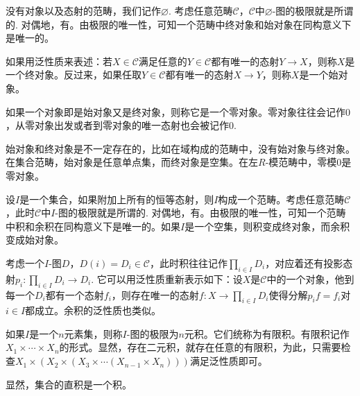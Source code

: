 \begin{para}[终对象与始对象]
没有对象以及态射的范畴，我们记作$\varnothing$. 考虑任意范畴$\mathcal{C}$，$\mathcal{C}$中$\varnothing$-图的极限就是所谓的. 对偶地，有。由极限的唯一性，可知一个范畴中终对象和始对象在同构意义下是唯一的。

如果用泛性质来表述：若$X\in \mathcal{C}$满足任意的$Y\in \mathcal{C}$都有唯一的态射$Y\to X$，则称$X$是一个终对象。反过来，如果任取$Y\in \mathcal{C}$都有唯一的态射$X\to Y$，则称$X$是一个始对象。

如果一个对象即是始对象又是终对象，则称它是一个零对象。零对象往往会记作$0$，从零对象出发或者到零对象的唯一态射也会被记作$0$.

始对象和终对象是不一定存在的，比如在域构成的范畴中，没有始对象与终对象。在集合范畴，始对象是任意单点集，而终对象是空集。在左$R$-模范畴中，零模$0$是零对象。
\end{para}

\begin{para}[积与余积]
设$I$是一个集合，如果附加上所有的恒等态射，则$I$构成一个范畴。考虑任意范畴$\mathcal{C}$，此时$\mathcal{C}$中$I$-图的极限就是所谓的. 对偶地，有。由极限的唯一性，可知一个范畴中积和余积在同构意义下是唯一的。如果$I$是一个空集，则积变成终对象，而余积变成始对象。

考虑一个$I$-图$D$，$D(i)=D_i\in \mathcal{C}$，此时积往往记作$\prod_{i\in I} D_i$，对应着还有投影态射$p_i:\prod_{i\in I} D_i\to D_i$. 它可以用泛性质重新表示如下：设$X$是$\mathcal{C}$中的一个对象，他到每一个$D_i$都有一个态射$f_i$，则存在唯一的态射$f:X\to \prod_{i\in I} D_i$使得分解$p_if=f_i$对$i\in I$都成立。余积的泛性质也类似。

如果$I$是一个$n$元素集，则称$I$-图的极限为$n$元积。它们统称为有限积。有限积记作$X_1\times \cdots \times X_n$的形式。显然，存在二元积，就存在任意的有限积，为此，只需要检查$X_1\times (X_2\times (X_3 \times \cdots (X_{n-1}\times X_n)))$满足泛性质即可。
\end{para}

显然，集合的直积是一个积。

